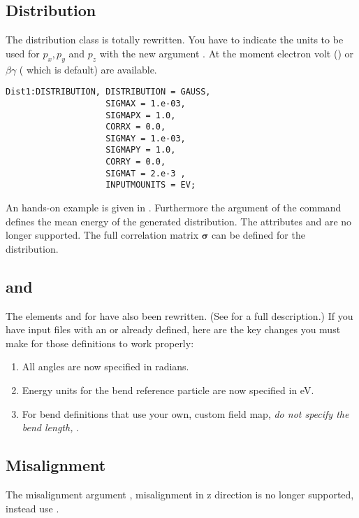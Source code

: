 \subsection{Distribution}
The distribution class is totally rewritten. You have to indicate the units to be used for $p_x,p_y$ and $p_z$ with the
new argument . At the moment electron volt () or $\beta\gamma$ ( which is default) are available.
\begin{Verbatim}[label={My orange command sample output}]
Dist1:DISTRIBUTION, DISTRIBUTION = GAUSS,
                    SIGMAX = 1.e-03,
                    SIGMAPX = 1.0,
                    CORRX = 0.0,
                    SIGMAY = 1.e-03,
                    SIGMAPY = 1.0,
                    CORRY = 0.0,
                    SIGMAT = 2.e-3 ,
                    INPUTMOUNITS = EV;
\end{Verbatim}
An hands-on example is given in . Furthermore the  argument of the  command defines the mean energy of the generated distribution. The attributes  and  are no longer supported. The full
correlation matrix $\mathbf\sigma$ can be defined for the  distribution.

\subsection{ and }
The elements  and  for \opalt have also been rewritten. (See  for a
full description.) If you have input files with an  or  already defined, here are the key
changes you must make for those definitions to work properly:

\begin{enumerate}
\item All angles are now specified in radians.
\item Energy units for the bend reference particle are now specified in eV.
\item For bend definitions that use your own, custom field map, \emph{do not specify the bend length, }.
\end{enumerate}

\subsection{Misalignment}
The misalignment argument , misalignment in z direction is no longer supported, instead use .

